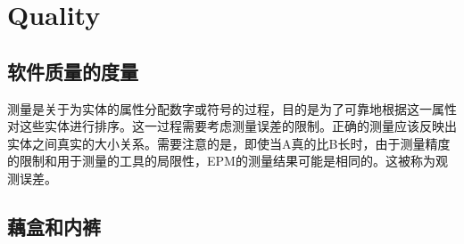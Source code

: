 \chapter{Quality}

\section{软件质量的度量}

测量是关于为实体的属性分配数字或符号的过程，目的是为了可靠地根据这一属性对这些实体进行排序。这一过程需要考虑测量误差的限制。正确的测量应该反映出实体之间真实的大小关系。需要注意的是，即使当A真的比B长时，由于测量精度的限制和用于测量的工具的局限性，EPM的测量结果可能是相同的。这被称为观测误差。

\section{藕盒和内裤}

